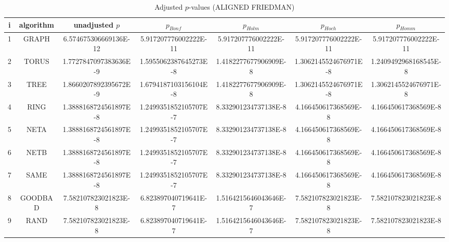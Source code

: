 \documentclass[a4paper,10pt]{article}
\begin{document}
\begin{landscape}
\begin{table}[!htp]
\centering\scriptsize
\caption{Adjusted $p$-values (ALIGNED FRIEDMAN)}
\begin{tabular}{ccccccc}
i&algorithm&unadjusted $p$&$p_{Bonf}$&$p_{Holm}$&$p_{Hoch}$&$p_{Homm}$\\
\hline
1& GRAPH&6.574675306669136E-12&5.917207776002222E-11&5.917207776002222E-11&5.917207776002222E-11&5.917207776002222E-11\\
2& TORUS&1.7727847097383636E-9&1.5955062387645273E-8&1.4182277677906909E-8&1.3062145524676971E-8&1.2409492968168545E-8\\
3& TREE&1.8660207892395672E-9&1.6794187103156104E-8&1.4182277677906909E-8&1.3062145524676971E-8&1.3062145524676971E-8\\
4& RING&1.3888168724561897E-8&1.2499351852105707E-7&8.332901234737138E-8&4.166450617368569E-8&4.166450617368569E-8\\
5& NETA&1.3888168724561897E-8&1.2499351852105707E-7&8.332901234737138E-8&4.166450617368569E-8&4.166450617368569E-8\\
6& NETB&1.3888168724561897E-8&1.2499351852105707E-7&8.332901234737138E-8&4.166450617368569E-8&4.166450617368569E-8\\
7& SAME&1.3888168724561897E-8&1.2499351852105707E-7&8.332901234737138E-8&4.166450617368569E-8&4.166450617368569E-8\\
8& GOODBAD&7.582107823021823E-8&6.823897040719641E-7&1.5164215646043646E-7&7.582107823021823E-8&7.582107823021823E-8\\
9& RAND&7.582107823021823E-8&6.823897040719641E-7&1.5164215646043646E-7&7.582107823021823E-8&7.582107823021823E-8\\
\hline
\end{tabular}
\end{table}


\end{landscape}
\end{document}
